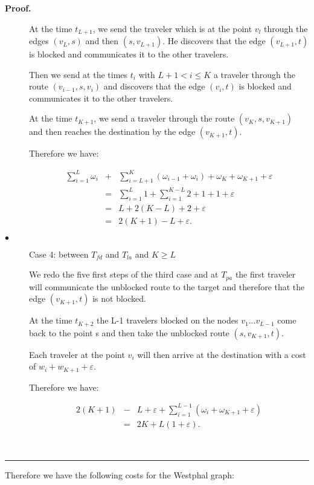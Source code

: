 \documentclass[letter-size, 11pt]{article}
\newenvironment{proof}[1][Proof]{\textbf{#1.} }{\ \rule{0.5em}{0.5em}}
\begin{document}
\begin{proof}
\begin{description}
At the time $t_{L+1}$, we send the traveler which is at the point $v_l$ through the edges $(v_{L},s)$ and then $(s,v_{L+1})$. He discovers that the edge $(v_{L+1},t)$ is blocked and communicates it to the other travelers.

Then we send at the times $t_i$ with $L+1 < i \leq K$ a traveler through the route $(v_{i-1},s,v_i)$ and discovers that the edge $(v_i,t)$ is blocked and communicates it to the other travelers.

At the time $t_{K+1}$, we send a traveler through the route $(v_K,s,v_{K+1})$ and then reaches the destination by the edge $(v_{K+1},t)$. 

Therefore we have: 

\begin{eqnarray}
\sum_{i=1}^{L} \omega_{i} &+& \sum_{i=L+1}^{K}(\omega_{i-1} + \omega_{i} ) + \omega_{K} + \omega_{K+1} + \varepsilon  \nonumber\\
&=&\sum_{i=1}^{L} 1 + \sum_{i=1}^{K-L}2 + 1 + 1 + \varepsilon\nonumber \\
&=& L + 2(K - L) + 2 + \varepsilon \nonumber\\
&=& 2(K + 1 ) - L + \varepsilon.\nonumber
\end{eqnarray}

\item[$\bullet$] Case 4: between $T_{fd}$ and $T_{la}$ and $K \geq L$

We redo the five first steps of the third case and at $ T_{pa}$ the first traveler will communicate the unblocked route to the target and therefore that the edge $(v_{K+1},t)$ is not blocked.

At the time $t_{K+2}$ the L-1 travelers blocked on the nodes $v_{1} ... v_{L-1} $ come back to the point s and then take the unblocked route $(s,v_{K+1},t)$.

Each traveler at the point $v_i$ will then arrive at the destination with a cost of $w_i + w_{K+1} + \varepsilon$. 

Therefore we have:

\begin{eqnarray}
2(K + 1) & - & L + \varepsilon + \sum_{i=1}^{L-1}(\omega_{i} + \omega_{K+1} + \varepsilon ) \nonumber\\
& = & 2K + L(1+\varepsilon).\nonumber
\end{eqnarray}


\end{description}
\end{proof}

Therefore we have the following costs for the Westphal graph:
\end{document}
